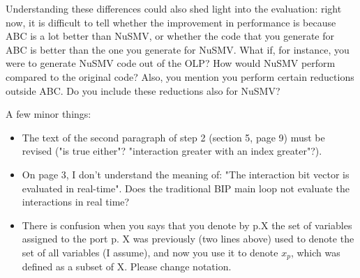 Understanding these differences could also shed light into the evaluation:
right now, it is difficult to tell whether the improvement in performance is
because ABC is a lot better than NuSMV, or whether the code that you generate
for ABC is better than the one you generate for NuSMV. What if, for instance,
you were to generate NuSMV code out of the OLP? How would NuSMV perform
compared to the original code? Also, you mention you perform certain
reductions outside ABC. Do you include these reductions also for NuSMV?


A few minor things:

\begin{itemize}
\item The text of the second paragraph of step 2 (section 5, page 9) must be
revised ("is true either"? "interaction greater with an index greater"?).
\done
{}

\item On page 3, I don't understand the meaning of: "The interaction bit vector is
evaluated in real-time". Does the traditional BIP main loop not evaluate the
interactions in real time?

\item There is confusion when you says that you denote by p.X the set of variables
assigned to the port p. X was previously (two lines above) used to denote
the set of all variables (I assume), and now you use it to denote $x_p$, which
was defined as a subset of X. Please change notation.
\end{itemize}



